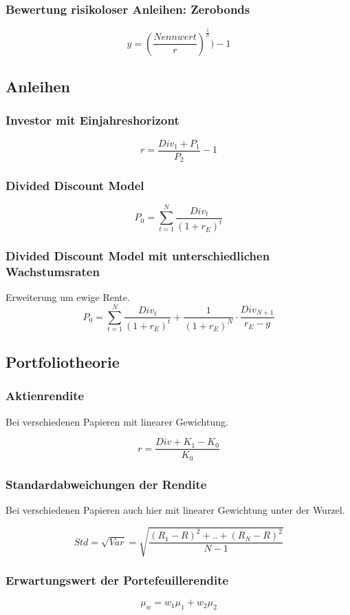 \subsubsection{Bewertung risikoloser Anleihen: Zerobonds}
\[y = (\frac{Nennwert}{r})^{\frac{1}{n}})-1\]


\subsection{Anleihen}

\subsubsection{Investor mit Einjahreshorizont}
\[r = \frac{Div_1+P_1}{P_2}-1\]

\subsubsection{Divided Discount Model}
\[P_0 = \sum_{t=1}^{N} \frac{Div_t}{(1+r_E)^t}\]

\subsubsection{Divided Discount Model mit unterschiedlichen Wachstumsraten}
Erweiterung um ewige Rente.
\[P_0 = \sum_{t=1}^{N} \frac{Div_t}{(1+r_E)^t} + \frac{1}{(1+r_E)^N}\cdot\frac{Div_{N+1}}{r_E-g}\]


\subsection{Portfoliotheorie}

\subsubsection{Aktienrendite}
Bei verschiedenen Papieren mit linearer Gewichtung.

\[r = \frac{Div + K_1 - K_0}{K_0}\]

\subsubsection{Standardabweichungen der Rendite}
Bei verschiedenen Papieren auch hier mit linearer Gewichtung unter der Wurzel.

\[Std = \sqrt{Var} = \sqrt{\frac{(R_1-R)^2+..+(R_N-R)^2}{N-1}}\]

\subsubsection{Erwartungswert der Portefeuillerendite}
\[\mu_w = w_1\mu_1 + w_2\mu_2\]

